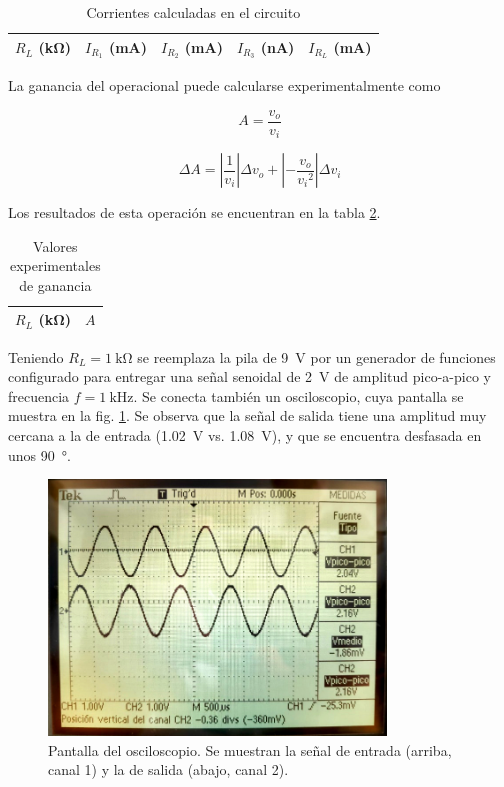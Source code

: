 \begin{table}[H]
    \centering
    \begin{tabular}{@{}rrrrr@{}}
        \toprule
        $R_L$ (\si{\kilo\ohm}) & $I_{R_1}$ (\si{\milli\ampere}) & $I_{R_2}$ (\si{\milli\ampere}) & $I_{R_3}$ (\si{\nano\ampere}) & $I_{R_L}$ (\si{\milli\ampere}) \\
        \midrule
        
    \end{tabular}
    \caption{Corrientes calculadas en el circuito}
    \label{tab:1-datos:corrientes}
\end{table}

La ganancia del operacional puede calcularse experimentalmente como

\begin{equation}
    \label{ec:1-teoria:ganancia-experimental}
    A = \frac{v_o}{v_i}
\end{equation}

\begin{equation}
    \label{ec:1-teoria:err-ganancia-experimental}
    \Delta A = \left| \frac{1}{v_i} \right| \Delta v_o + \left| -\frac{v_o}{{v_i}^2} \right| \Delta v_i
\end{equation}

Los resultados de esta operación se encuentran en la tabla \ref{tab:1-teoria:ganancia-experimental}.

\begin{table}[H]
    \centering
    \begin{tabular}{@{}rr@{}}
        \toprule
        $R_L$ (\si{\kilo\ohm}) & $A$ \\
        \midrule
        
    \end{tabular}
    \caption{Valores experimentales de ganancia}
    \label{tab:1-teoria:ganancia-experimental}
\end{table}

Teniendo $R_L = \SI{1}{\kilo\ohm}$ se reemplaza la pila de \SI{9}{\volt} por
un generador de funciones configurado para entregar una señal senoidal de
\SI{2}{\volt} de amplitud pico-a-pico y frecuencia $f = \SI{1}{\kilo\hertz}$.
Se conecta también un osciloscopio, cuya pantalla
se muestra en la fig. \ref{fig:1-datos:osciloscopio}. Se observa que la señal
de salida tiene una amplitud muy cercana a la de entrada (\SI{1.02}{\volt} vs.
\SI{1.08}{\volt}), y que se encuentra desfasada en unos \SI{90}{\degree}.

\begin{figure}[H]
    \centering
    \includegraphics[width=0.8\textwidth]{img/1/osciloscopio-1.jpg}
    \caption{Pantalla del osciloscopio. Se muestran la señal de entrada
        (arriba, canal 1) y la de salida (abajo, canal 2).}
    \label{fig:1-datos:osciloscopio}
\end{figure}
